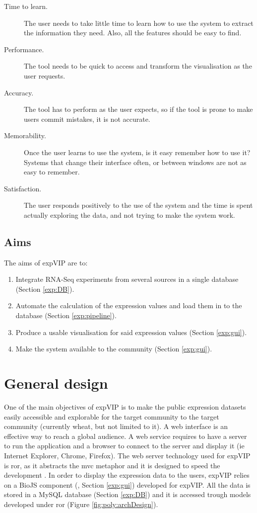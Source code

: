 \begin{description}
\item[Time to learn.] The user needs to take little time to learn how to use the system to extract the information they need. Also, all the features should be easy to find.
\item[Performance.] The tool needs to be quick to access and transform the visualisation as the user requests.
\item[Accuracy.] The tool has to perform as the user expects, so if the tool is prone to make users commit mistakes, it is not accurate. 
\item[Memorability.] Once the user learns to use the system, is it easy remember how to use it? Systems that change their interface often, or between windows are not as easy to remember. 
\item[Satisfaction.] The user responds positively to the use of the system and the time is spent actually exploring the data, and not trying to make the system work. 
\end{description}

\subsection{Aims}

The aims of expVIP are to:
\begin{enumerate}
\item Integrate RNA-Seq experiments from several sources in a single database (Section \ref{exp:DB}). 
\item Automate the calculation of the expression values and load them in to the database (Section \ref{exp:pipeline}).
\item Produce a usable visualisation for said expression values (Section \ref{exp:gui}).
\item Make the system available to the community (Section \ref{exp:gui}).
\end{enumerate}


\section{General design}

One of the main objectives of expVIP is to make the public expression datasets easily accessible and explorable for the target community to the target community (currently wheat, but not limited to it). 
A web interface is an effective way to reach a global audience. 
A web service requires to have a server to run the application and a browser to connect to the server and display it (ie Internet Explorer, Chrome, Firefox).
The web server technology used for expVIP is \acrshort{ror}, as it abstracts the \acrshort{mvc} metaphor and it is designed to speed the development \citep{RailsGuide2016}. 
In order to display the expression data to the users,  expVIP relies on a BioJS component (\citealt{Yachdav2015}, Section \ref{exp:gui}) developed for expVIP. 
All the data is stored in a MySQL database (Section \ref{exp:DB}) and it is accessed trough models developed under  \acrshort{ror} (Figure \ref{fig:poly:archDesign}).  

